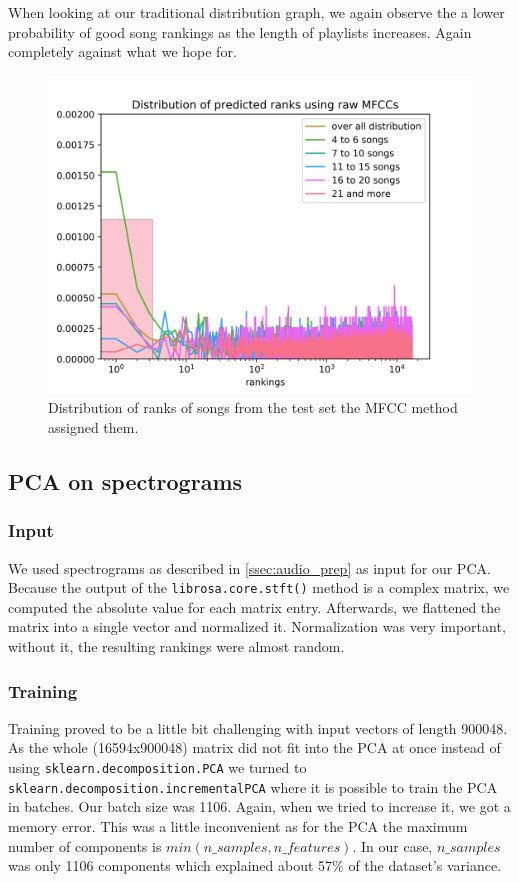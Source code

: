  When looking at our traditional distribution graph, we again observe the a lower probability of good song rankings as the length of playlists increases. Again completely against what we hope for. 
\begin{figure}[h]
    \centering
	\includegraphics[width=120mm]{./img/mfcc_graph.png}
	\caption{Distribution of ranks of songs from the test set the MFCC method assigned them.}
	\label{fig:mfcc_graph}
\end{figure}


\subsection {PCA on spectrograms}

\subsubsection{Input}
We used spectrograms as described in \ref{ssec:audio_prep} as input for our PCA. Because the output of the \texttt{librosa.core.stft()} method is a complex matrix, we computed the absolute value for each matrix entry. Afterwards, we flattened the matrix into a single vector and normalized it. Normalization was very important, without it, the resulting rankings were almost random.

\subsubsection{Training}
Training proved to be a little bit challenging with input vectors of length 900048. As the whole (16594x900048) matrix did not fit into the PCA at once instead of using \texttt{sklearn.decomposition.PCA} we turned to \texttt{sklearn.decomposition.incrementalPCA} where it is possible to train the PCA in batches. Our batch size was 1106. Again, when we tried to increase it, we got a memory error. This was a little inconvenient as for the PCA the maximum number of components is $min(n\_samples, n\_features)$. In our case, $n\_samples$ was only 1106 components which explained about 57\% of the dataset's variance.

